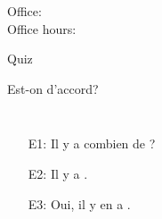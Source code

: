 \documentclass{beamer}
\subtitle[Les quantités]{Les quantités}
\begin{document}
  \begin{frame}
    \titlepage
    \tiny{Office: \\
          Office hours: }
  \end{frame}

  \begin{frame}{}
    \begin{center}
      \Large Quiz
    \end{center}
  \end{frame}

  \begin{frame}{Est-on d'accord?}
    \begin{columns}
        \begin{itemize}
          \item[E1:] Il y a combien de \underline{}?
          \item[E2:] Il y a \underline{}.
          \item[E3:] Oui, il y en a \underline{}.
        \end{itemize}
        \begin{minipage}[c][0.6\textheight]{\linewidth}
          \begin{center}
          \end{center}
        \end{minipage}
    \end{columns}
  \end{frame}
\end{document}
